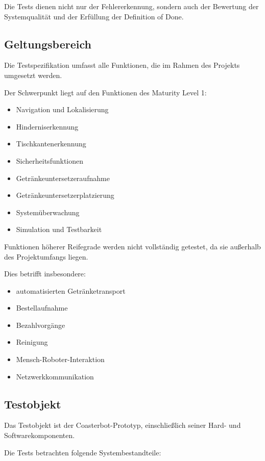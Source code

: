 Die Tests dienen nicht nur der Fehlererkennung, sondern auch der
Bewertung der Systemqualität und der Erfüllung der Definition of Done.

\subsection{Geltungsbereich}\label{geltungsbereich}

Die Testspezifikation umfasst alle Funktionen, die im Rahmen des
Projekts umgesetzt werden.

Der Schwerpunkt liegt auf den Funktionen des Maturity Level 1:

\begin{itemize}
\tightlist
\item
  Navigation und Lokalisierung
\item
  Hinderniserkennung
\item
  Tischkantenerkennung
\item
  Sicherheitsfunktionen
\item
  Getränkeuntersetzeraufnahme
\item
  Getränkeuntersetzerplatzierung
\item
  Systemüberwachung
\item
  Simulation und Testbarkeit
\end{itemize}

Funktionen höherer Reifegrade werden nicht vollständig getestet, da sie
außerhalb des Projektumfangs liegen.

Dies betrifft insbesondere:

\begin{itemize}
\tightlist
\item
  automatisierten Getränketransport
\item
  Bestellaufnahme
\item
  Bezahlvorgänge
\item
  Reinigung
\item
  Mensch-Roboter-Interaktion
\item
  Netzwerkkommunikation
\end{itemize}

\subsection{Testobjekt}\label{testobjekt}

Das Testobjekt ist der Coasterbot-Prototyp, einschließlich seiner Hard-
und Softwarekomponenten.

Die Tests betrachten folgende Systembestandteile:

